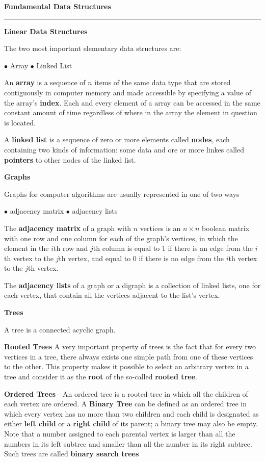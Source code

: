 \filbreak
\vskip 1cm
{\bf Fundamental Data Structures}
\vskip 1mm
\hrule

\vskip 3mm
{\bf Linear Data Structures}

\vskip 1mm
The two most important elementary data structures are:

\vskip 1mm
\quad$\bullet$ Array
\vskip 1mm
\quad$\bullet$ Linked List

\vskip 3mm
An {\bf array} is a sequence of $n$ items of the same data type that are stored contiguously in computer memory and made accessible by specifying a value of the array's {\bf index}. Each and every element of a array can be accessed in the same constant amount of time regardless of where in the array the element in question is located.

\vskip 3mm
A {\bf linked list} is a sequence of zero or more elements called {\bf nodes}, each containing two kinds of information: some data and ore or more linkes called {\bf pointers} to other nodes of the linked list.

\vskip 1cm
{\bf Graphs}

\vskip 1mm
Graphs for computer algorithms are usually represented in one of two ways

\vskip 1mm
\quad$\bullet$ adjacency matrix
\vskip 1mm
\quad$\bullet$ adjacency lists

\vskip 3mm
The {\bf adjacency matrix} of a graph with $n$ vertices is an $n\times n$ boolean matrix with one row and one column for each of the graph's vertices, in which the element in the $i$th row and $j$th column is equal to 1 if there is an edge from the $i$th vertex to the $j$th vertex, and equal to 0 if there is no edge from the $i$th vertex to the $j$th vertex.

\vskip 3mm
The {\bf adjacency lists} of a graph or a digraph is a collection of linked lists, one for each vertex, that contain all the vertices adjacent to the list's vertex.

\vskip 1cm
{\bf Trees}

\vskip 1mm
A tree is a connected acyclic graph.

\vskip 3mm
{\bf Rooted Trees} A very important property of trees is the fact that for every two vertices in a tree, there always exists one simple  path from one of these vertices to the other. This property makes it possible to select an arbitrary vertex in a tree and consider it as the {\bf root} of the so-called {\bf rooted tree}.

\vskip 3mm
{\bf Ordered Trees}---An ordered tree is a rooted tree in which all the children of each vertex are ordered. A {\bf Binary Tree} can be defined as an ordered tree in which every vertex has no more than two children and each child is designated as either {\bf left child} or a {\bf right child} of its parent; a binary tree may also be empty. Note that a number assigned to each parental vertex is larger than all the numbers in its left subtree and smaller than all the number in its right subtree. Such trees are called {\bf binary search trees}


